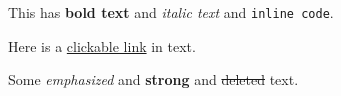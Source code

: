 This has \textbf{bold text} and \emph{italic text} and \texttt{inline code}.

Here is a \href{https://example.com}{clickable link} in text.

Some \emph{emphasized} and \textbf{strong} and \sout{deleted} text.

